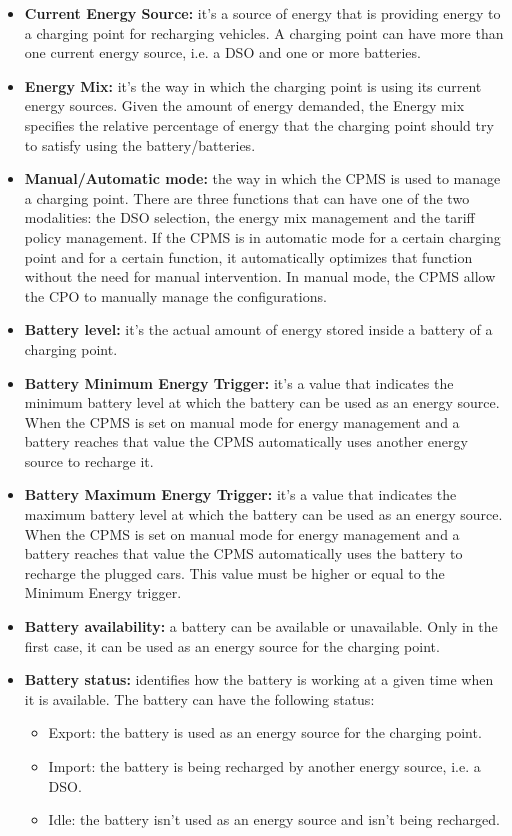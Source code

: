 \documentclass{Configuration_Files/PoliMi3i_thesis}
\begin{document}
\begin{itemize}
    \item \textbf{Current Energy Source:} it's a source of energy that is providing energy to a charging point for recharging vehicles. A charging point can have more than one current energy source, i.e. a DSO and one or more batteries.
    \item \textbf{Energy Mix:} it's the way in which the charging point is using its current energy sources. Given the amount of energy demanded, the Energy mix specifies the relative percentage of energy that the charging point should try to satisfy using the battery/batteries.
    \item \textbf{Manual/Automatic mode:} the way in which the CPMS is used to manage a charging point. There are three functions that can have one of the two modalities: the DSO selection, the energy mix management and the tariff policy management. If the CPMS is in automatic mode for a certain charging point and for a certain function, it automatically optimizes that function without the need for manual intervention. In manual mode, the CPMS allow the CPO to manually manage the configurations.
    \item \textbf{Battery level:} it's the actual amount of energy stored inside a battery of a charging point.
    \item \textbf{Battery Minimum Energy Trigger:} it’s a value that indicates the minimum battery level at which the battery can be used as an energy source. When the CPMS is set on manual mode for energy management and a battery reaches that value the CPMS automatically uses another energy source to recharge it.
    \item \textbf{Battery Maximum Energy Trigger:} it’s a value that indicates the maximum battery level at which the battery can be used as an energy source. When the CPMS is set on manual mode for energy management and a battery reaches that value the CPMS automatically uses the battery to recharge the plugged cars. This value must be higher or equal to the Minimum Energy trigger.
    \item \textbf{Battery availability:} a battery can be available or unavailable. Only in the first case, it can be used as an energy source for the charging point.
    \item \textbf{Battery status:} identifies how the battery is working at a given time when it is available. The battery can have the following status:
        \begin{itemize}
            \item Export: the battery is used as an energy source for the charging point.
            \item Import: the battery is being recharged by another energy source, i.e. a DSO.
            \item Idle: the battery isn't used as an energy source and isn't being recharged.
        \end{itemize}
\end{itemize}
\end{document}
